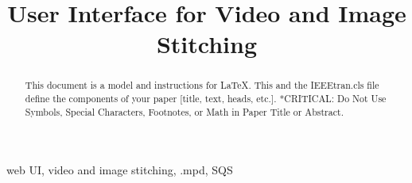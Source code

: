 \documentclass[conference]{IEEEtran}
\begin{document}
\title{User Interface for Video and Image Stitching}

\author{
\and
{}
\and
{}
}

\maketitle

\begin{abstract}
This document is a model and instructions for \LaTeX.
This and the IEEEtran.cls file define the components of your paper [title, text, heads, etc.]. *CRITICAL: Do Not Use Symbols, Special Characters, Footnotes, 
or Math in Paper Title or Abstract.
\end{abstract}

\begin{IEEEkeywords}
web UI, video and image stitching, .mpd, SQS
\end{IEEEkeywords}
\end{document}
